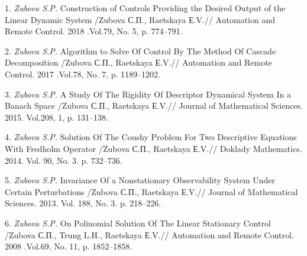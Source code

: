 1. {\it  Zubova S.P.} Construction of Controls Providing the Desired Output of the Linear Dynamic System /Zubova С.П., Raetskaya Е.V.// Automation and Remote Control. 2018 .Vol.79, No. 5, p. 774--791.

2. {\it Zubova S.P.} Algorithm to Solve Of Control By The Method Of Cascade Decomposition /Zubova С.П., Raetskaya Е.V.// Automation and Remote Control. 2017 .Vol.78, No. 7, p. 1189--1202.

3. {\it Zubova S.P.} A Study Of The Rigidity Of Descriptor Dynamical System In a Banach Space /Zubova С.П., Raetskaya Е.V.// Journal of Mathematical Sciences. 2015. Vol.208, 1, p. 131--138.


4. {\it Zubova S.P.} Solution Of The Coushy Problem For Two Descriptive Equations With Fredholm Operator /Zubova С.П., Raetskaya Е.V.//
Doklady Mathematics. 2014. Vol. 90, No. 3. p. 732--736.

5. {\it Zubova S.P.} Invariance Of a Nonstationary Observability System Under Certain Perturbations /Zubova С.П., Raetskaya Е.V.// Journal of Mathematical Sciences. 2013. Vol. 188, No. 3. p. 218--226.

6. {\it Zubova S.P.} On Polinomial Solution Of The Linear Stationary Control /Zubova С.П., Trung L.H., Raetskaya Е.V.// Automation and Remote Control. 2008 .Vol.69, No. 11, p. 1852--1858.
